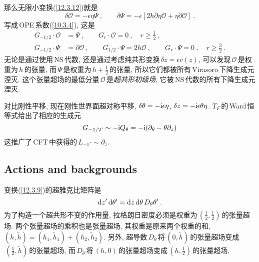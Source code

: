 那么无限小变换(\ref{12.3.12})就是
\begin{equation}
    \delta \mathcal{O} = -\epsilon\eta\varPsi\:, \qquad 
    \delta \varPsi=-\epsilon[2h\partial\eta \mathcal{O}+\eta\partial\mathcal{O}] \:. \label{12.3.14}
\end{equation}
写成\,OPE\,系数(\ref{10.3.4}), 这是
\begin{subequations}
\begin{align}
    G_{-1/2}\cdot \mathcal{O} &= \varPsi\:, \qquad G_{r}\cdot \mathcal{O}=0\:, \quad r\geq \tfrac{1}{2} \:,\label{12.3.15a} \\ 
    G_{-1/2}\cdot \varPsi &= \partial\mathcal{O}\:, \qquad G_{1/2}\cdot \varPsi = 2h\mathcal{O}\:,
    \qquad G_{r}\cdot\varPsi=0\:,\quad r\geq \tfrac{3}{2} \:. \label{12.3.15b}
\end{align}\label{12.3.15}
\end{subequations}
无论是通过使用\,NS\,代数, 还是通过考虑纯共形变换$\,\delta z=\epsilon v(z)$, 可以发现$\,\mathcal{O}\,$是权重为$\,h\,$的张量, 而$\,\varPsi\,$是权重为$\,h+\tfrac{1}{2}\,$的张量, 所以它们都被所有\,Virasoro\,下降生成元湮灭. 这个张量超场的最低分量$\,\mathcal{O}\,$是{\emph{超共形初级场}}, 它被\,NS\,代数的所有下降生成元湮灭.

对比刚性平移, 现在刚性世界面超对称平移, $\delta\theta =-\mathrm{i}\epsilon\eta$, $\delta z=-\mathrm{i}\epsilon\theta\eta$. $T_{F}\,$的\,Ward\,恒等式给出了相应的生成元
\begin{equation}
    G_{-1/2}\cdot \sim -\mathrm{i} Q_{\theta} = -\mathrm{i}(\partial_{\theta}-\theta\partial_{z}) \label{12.3.16}
\end{equation}
这推广了\,CFT\,中获得的$\,L_{-1}\cdot \sim \partial_{z}$.

\subsection*{Actions and backgrounds}

变换(\ref{12.3.9})的超雅克比矩阵是
\begin{equation}
    \mathrm{d} z^{\prime}\,\mathrm{d}\theta^{\prime} = \mathrm{d} z\,\mathrm{d}\theta\,D_{\theta}\theta^{\prime}\:. \label{12.3.17}
\end{equation}
为了构造一个超共形不变的作用量, 拉格朗日密度必须是权重为$\,(\tfrac{1}{2},\tfrac{1}{2})\,$的张量超场. 两个张量超场的乘积也是张量超场, 其权重是原来两个权重的和, $(h,\tilde{h})=(h_{1},\tilde{h}_{1})+(h_{2},\tilde{h}_{2})$. 另外, 超导数$\,D_{\theta}\,$将$\,(0,\tilde{h})\,$的张量超场变成$\,(\tfrac{1}{2},\tilde{h})\,$的张量超场, 而$\,D_{\bar{\theta}}\,$将$\,(h,0)\,$的张量超场变成$\,(h,\tfrac{1}{2})\,$的张量超场.

